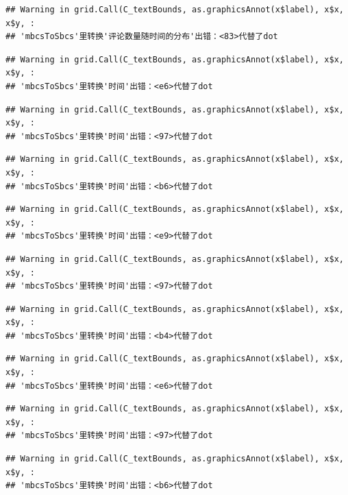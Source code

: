 \documentclass[
]{article}
\begin{document}
\begin{verbatim}
## Warning in grid.Call(C_textBounds, as.graphicsAnnot(x$label), x$x, x$y, :
## 'mbcsToSbcs'里转换'评论数量随时间的分布'出错：<83>代替了dot
\end{verbatim}

\begin{verbatim}
## Warning in grid.Call(C_textBounds, as.graphicsAnnot(x$label), x$x, x$y, :
## 'mbcsToSbcs'里转换'时间'出错：<e6>代替了dot
\end{verbatim}

\begin{verbatim}
## Warning in grid.Call(C_textBounds, as.graphicsAnnot(x$label), x$x, x$y, :
## 'mbcsToSbcs'里转换'时间'出错：<97>代替了dot
\end{verbatim}

\begin{verbatim}
## Warning in grid.Call(C_textBounds, as.graphicsAnnot(x$label), x$x, x$y, :
## 'mbcsToSbcs'里转换'时间'出错：<b6>代替了dot
\end{verbatim}

\begin{verbatim}
## Warning in grid.Call(C_textBounds, as.graphicsAnnot(x$label), x$x, x$y, :
## 'mbcsToSbcs'里转换'时间'出错：<e9>代替了dot
\end{verbatim}

\begin{verbatim}
## Warning in grid.Call(C_textBounds, as.graphicsAnnot(x$label), x$x, x$y, :
## 'mbcsToSbcs'里转换'时间'出错：<97>代替了dot
\end{verbatim}

\begin{verbatim}
## Warning in grid.Call(C_textBounds, as.graphicsAnnot(x$label), x$x, x$y, :
## 'mbcsToSbcs'里转换'时间'出错：<b4>代替了dot
\end{verbatim}

\begin{verbatim}
## Warning in grid.Call(C_textBounds, as.graphicsAnnot(x$label), x$x, x$y, :
## 'mbcsToSbcs'里转换'时间'出错：<e6>代替了dot
\end{verbatim}

\begin{verbatim}
## Warning in grid.Call(C_textBounds, as.graphicsAnnot(x$label), x$x, x$y, :
## 'mbcsToSbcs'里转换'时间'出错：<97>代替了dot
\end{verbatim}

\begin{verbatim}
## Warning in grid.Call(C_textBounds, as.graphicsAnnot(x$label), x$x, x$y, :
## 'mbcsToSbcs'里转换'时间'出错：<b6>代替了dot
\end{verbatim}
\end{document}
